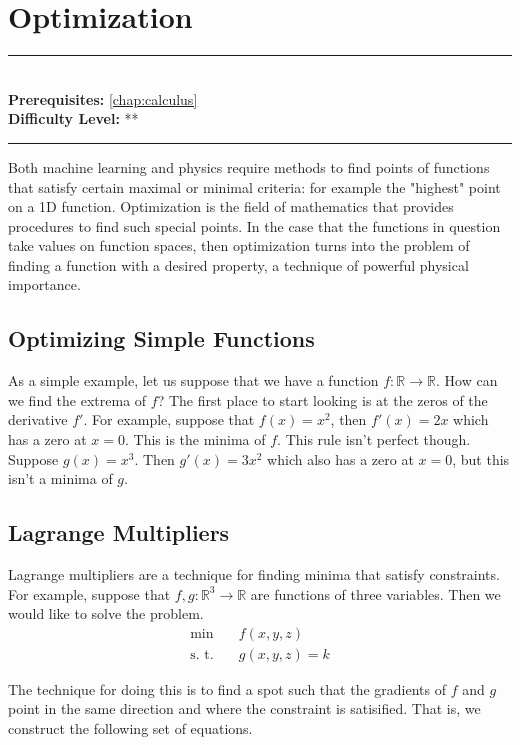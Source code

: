 \documentclass[book.tex]{subfiles}
\begin{document}
\chapter{Optimization}
\label{chap:optimization}
\noindent\rule{11cm}{0.4pt} \\
\textbf{Prerequisites:} \autoref{chap:calculus} \\
\textbf{Difficulty Level:} ** \\
\noindent\rule{11cm}{0.4pt}
\vspace{5mm}

Both machine learning and physics require methods to find points of functions that satisfy certain maximal or minimal criteria: for example the "highest" point on a 1D function. Optimization is the field of mathematics that provides procedures to find such special points. In the case that the functions in question take values on function spaces, then optimization turns into the problem of finding a function with a desired property, a technique of powerful physical importance.

\section{Optimizing Simple Functions}

As a simple example, let us suppose that we have a function $f: \mathbb{R} \to \mathbb{R}$. How can we find the extrema of $f$? The first place to start looking is at the zeros of the derivative $f'$. For example, suppose that $f(x) = x^2$, then $f'(x) = 2x$ which has a zero at $x=0$. This is the minima of $f$. This rule isn't perfect though. Suppose $g(x) = x^3$. Then $g'(x) = 3x^2$ which also has a zero at $x=0$, but this isn't a minima of $g$. 


\section{Lagrange Multipliers}

Lagrange multipliers are a technique for finding minima that satisfy constraints. For example, suppose that $f, g: \mathbb{R}^3 \to \mathbb{R}$ are functions of three variables. Then we would like to solve the problem.
\begin{align}
    \min &\quad f(x, y, z)\\
    \textrm{s. t.} &\quad g(x, y, z) = k
\end{align}

The technique for doing this is to find a spot such that the gradients of $f$ and $g$ point in the same direction and where the constraint is satisified. That is, we construct the following set of equations.
\end{document}
